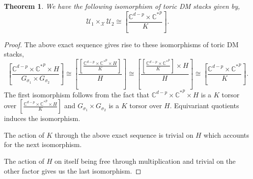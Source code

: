 \documentclass[10pt]{amsart}
\newtheorem{thm}[prop]{Theorem}
\newcommand{\sX}{{\mathcal X}}
\numberwithin{equation}{subsection}
\begin{document}
\begin{thm}
We have the following isomorphism of toric DM stacks given by,
$$\mathscr{U}_1\times_{\sX}\mathscr{U}_{2}\cong [\frac{\mathbb{C}^{d-p}\times \mathbb{C^*}^{p}}{K}].$$   
\end{thm}
\begin{proof}
The above exact sequence gives rise to these isomorphisms of toric DM stacks,
$$[\frac{\mathbb{C}^{d-p}\times \mathbb{C^*}^{p}\times H}{G_{\sigma_1}\times G_{\sigma_2}}]\cong [\frac{[\frac{\mathbb{C}^{d-p}\times \mathbb{C^*}^{p}\times H}{K}]}{H}]\cong [\frac{[\frac{\mathbb{C}^{d-p}\times \mathbb{C^*}^{p}}{K}]\times H}{H}]
\cong [\frac{\mathbb{C}^{d-p}\times \mathbb{C^*}^{p}}{K}].$$ 
The first isomorphism follows from the fact that $\mathbb{C}^{d-p}\times \mathbb{C^*}^{p}\times H$ is a $K$ torsor over ${[\frac{\mathbb{C}^{d-p}\times \mathbb{C^*}^{p}\times H}{K}]}$ and  $G_{\sigma_1}\times G_{\sigma_2}$ is a $K$ torsor over $H.$ Equivariant quotients induces the isomorphism.\par
The action of $K$ through the above exact sequence is trivial on $H$ which accounts for the next isomorphism.\par The action of $H$ on itself being free through multiplication and trivial on the other factor gives us the last isomorphism.

\end{proof}
\end{document}

